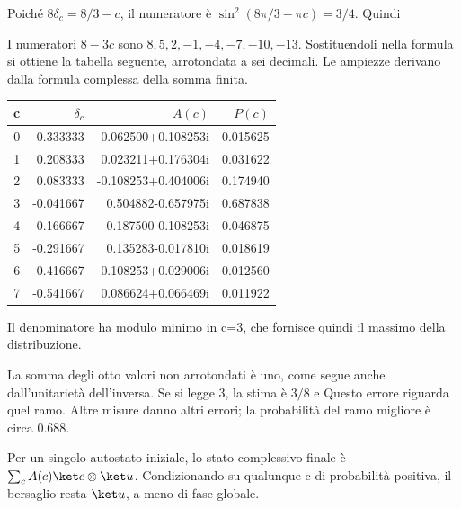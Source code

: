
Poiché \(8\delta_c=8/3-c\), il numeratore è \(\sin^2(8\pi/3-\pi c)=3/4\). Quindi


I numeratori \(8-3c\) sono \(8,5,2,-1,-4,-7,-10,-13\). Sostituendoli nella formula si ottiene la tabella seguente, arrotondata a sei decimali. Le ampiezze derivano dalla formula complessa della somma finita.\begin{center}\begin{tabular}{rrrr}\toprule c&$\delta_c$&$A(c)$&$P(c)$\\\midrule
0&0.333333&0.062500+0.108253i&0.015625\\
1&0.208333&0.023211+0.176304i&0.031622\\
2&0.083333&-0.108253+0.404006i&0.174940\\
3&-0.041667&0.504882-0.657975i&0.687838\\
4&-0.166667&0.187500-0.108253i&0.046875\\
5&-0.291667&0.135283-0.017810i&0.018619\\
6&-0.416667&0.108253+0.029006i&0.012560\\
7&-0.541667&0.086624+0.066469i&0.011922\\
\bottomrule\end{tabular}\end{center}


Il denominatore ha modulo minimo in c=3, che fornisce quindi il massimo della distribuzione.


La somma degli otto valori non arrotondati è uno, come segue anche dall’unitarietà dell’inversa. Se si legge 3, la stima è \(3/8\) e
Questo errore riguarda quel ramo. Altre misure danno altri errori; la probabilità del ramo migliore è circa 0.688.


Per un singolo autostato iniziale, lo stato complessivo finale è \(\sum_cA(c)\ket c\otimes\ket u\). Condizionando su qualunque c di probabilità positiva, il bersaglio resta \(\ket u\), a meno di fase globale.

